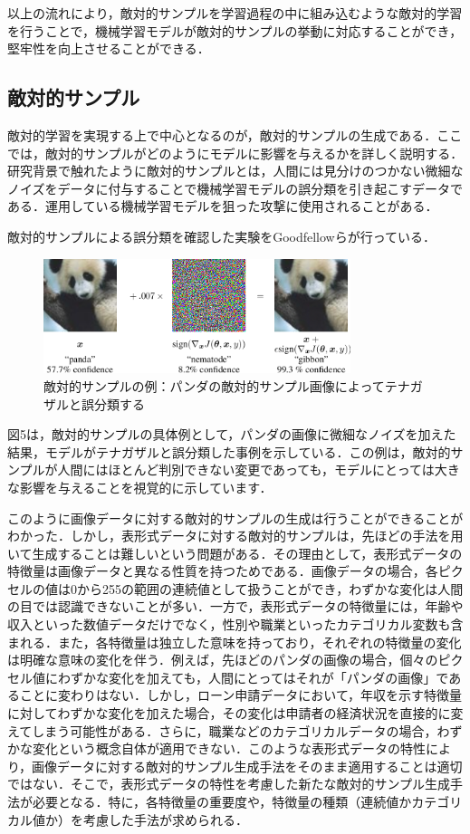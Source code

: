 以上の流れにより，敵対的サンプルを学習過程の中に組み込むような敵対的学習を行うことで，機械学習モデルが敵対的サンプルの挙動に対応することができ，堅牢性を向上させることができる．

\subsection{敵対的サンプル}
敵対的学習を実現する上で中心となるのが，敵対的サンプルの生成である．ここでは，敵対的サンプルがどのようにモデルに影響を与えるかを詳しく説明する．
研究背景で触れたように敵対的サンプルとは，人間には見分けのつかない微細なノイズをデータに付与することで機械学習モデルの誤分類を引き起こすデータである．\cite{MBSD-AdversarialExample}運用している機械学習モデルを狙った攻撃に使用されることがある．

敵対的サンプルによる誤分類を確認した実験をGoodfellowらが行っている\cite{goodfellow2015explaining}．
\begin{figure}[H]
    \centering
    \includegraphics[width=0.8\textwidth]{images/goodfellow_panda.png}
    \caption{敵対的サンプルの例：パンダの敵対的サンプル画像によってテナガザルと誤分類する\cite{goodfellow2015explaining}}
    \label{fig:adversarial_example}
\end{figure}

図5は，敵対的サンプルの具体例として，パンダの画像に微細なノイズを加えた結果，モデルがテナガザルと誤分類した事例を示している．この例は，敵対的サンプルが人間にはほとんど判別できない変更であっても，モデルにとっては大きな影響を与えることを視覚的に示しています．

このように画像データに対する敵対的サンプルの生成は行うことができることがわかった．しかし，表形式データに対する敵対的サンプルは，先ほどの手法を用いて生成することは難しいという問題がある．その理由として，表形式データの特徴量は画像データと異なる性質を持つためである．画像データの場合，各ピクセルの値は0から255の範囲の連続値として扱うことができ，わずかな変化は人間の目では認識できないことが多い．一方で，表形式データの特徴量には，年齢や収入といった数値データだけでなく，性別や職業といったカテゴリカル変数も含まれる．また，各特徴量は独立した意味を持っており，それぞれの特徴量の変化は明確な意味の変化を伴う．例えば，先ほどのパンダの画像の場合，個々のピクセル値にわずかな変化を加えても，人間にとってはそれが「パンダの画像」であることに変わりはない．しかし，ローン申請データにおいて，年収を示す特徴量に対してわずかな変化を加えた場合，その変化は申請者の経済状況を直接的に変えてしまう可能性がある．さらに，職業などのカテゴリカルデータの場合，わずかな変化という概念自体が適用できない．このような表形式データの特性により，画像データに対する敵対的サンプル生成手法をそのまま適用することは適切ではない．そこで，表形式データの特性を考慮した新たな敵対的サンプル生成手法が必要となる．特に，各特徴量の重要度や，特徴量の種類（連続値かカテゴリカル値か）を考慮した手法が求められる．


